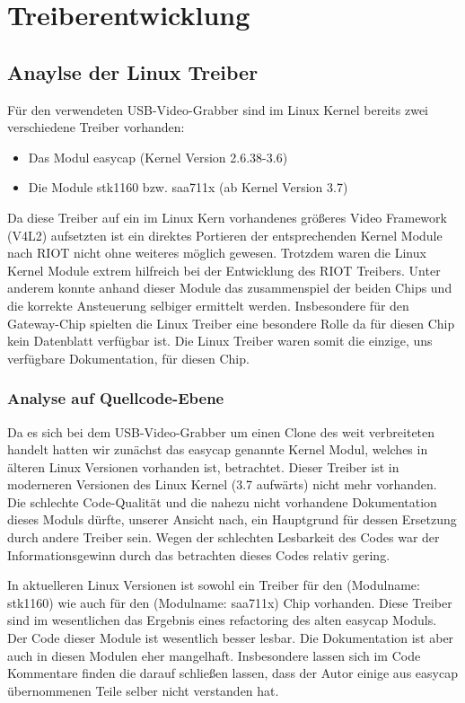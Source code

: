 \section{Treiberentwicklung}
\subsection{Anaylse der Linux Treiber}
Für den verwendeten USB-Video-Grabber sind im Linux Kernel bereits zwei 
verschiedene Treiber vorhanden: 
\begin{itemize}
 \item Das Modul easycap (Kernel Version 2.6.38-3.6)
 \item Die Module stk1160 bzw. saa711x (ab Kernel Version 3.7)
\end{itemize}
Da diese Treiber auf ein im Linux Kern 
vorhandenes größeres Video Framework (V4L2) \autocite{website:v4l2} aufsetzten ist ein direktes Portieren der 
entsprechenden Kernel Module nach RIOT nicht ohne weiteres möglich gewesen.
Trotzdem waren die Linux Kernel Module extrem hilfreich bei der Entwicklung
des RIOT Treibers. Unter anderem konnte anhand dieser Module das zusammenspiel
der beiden Chips und die korrekte Ansteuerung selbiger ermittelt werden.
Insbesondere für den Gateway-Chip \stk{} spielten die Linux Treiber eine
besondere Rolle da für diesen Chip kein Datenblatt verfügbar ist. Die Linux 
Treiber waren somit die einzige, uns verfügbare Dokumentation, für diesen Chip. 

\subsubsection{Analyse auf Quellcode-Ebene}
Da es sich bei dem USB-Video-Grabber um einen Clone des weit verbreiteten
\easycap{} handelt hatten wir zunächst das easycap genannte Kernel
Modul, welches in älteren Linux Versionen vorhanden ist, betrachtet. Dieser Treiber
ist in moderneren Versionen des Linux Kernel (3.7 aufwärts) nicht mehr vorhanden.
Die schlechte Code-Qualität und die nahezu nicht vorhandene Dokumentation dieses Moduls dürfte, unserer Ansicht nach, ein Hauptgrund für dessen Ersetzung durch andere Treiber sein. Wegen der schlechten Lesbarkeit des
Codes war der Informationsgewinn durch das betrachten dieses Codes relativ gering.

In aktuelleren Linux Versionen ist sowohl ein Treiber für den \stk{} (Modulname: stk1160) 
wie auch für den \saa{} (Modulname: saa711x) Chip vorhanden. Diese Treiber sind im wesentlichen 
das Ergebnis eines refactoring des alten easycap Moduls. Der Code dieser Module ist wesentlich 
besser lesbar. Die Dokumentation ist aber auch in diesen Modulen eher mangelhaft. Insbesondere 
lassen sich im Code Kommentare finden die darauf schließen lassen, dass der Autor einige aus easycap übernommenen Teile selber nicht verstanden hat.

